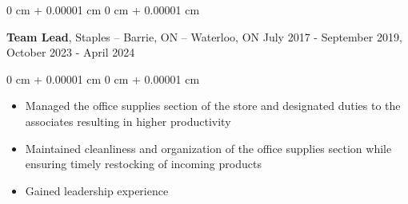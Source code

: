 \documentclass[10pt, letterpaper]{article}
\newenvironment{highlights}{
    \begin{itemize}[
        topsep=0.10 cm,
        parsep=0.10 cm,
        partopsep=0pt,
        itemsep=0pt,
        leftmargin=0 cm + 10pt
    ]
}{
    \end{itemize}
} %
\newenvironment{onecolentry}{
    \begin{adjustwidth}{
        0 cm + 0.00001 cm
    }{
        0 cm + 0.00001 cm
    }
}{
    \end{adjustwidth}
} %
\newenvironment{twocolentry}[2][]{
    \onecolentry
    \def\secondColumn{#2}
    \setcolumnwidth{\fill, 4.5 cm}
    \begin{paracol}{2}
}{
    \switchcolumn \raggedleft \secondColumn
    \end{paracol}
    \endonecolentry
} %
\begin{document}
        \vspace{0.2 cm}

        \begin{twocolentry}{
            July 2017 - September 2019, October 2023 - April 2024
        }
            \textbf{Team Lead}, Staples -- Barrie, ON -- Waterloo, ON\end{twocolentry}

        \vspace{0.10 cm}
        \begin{onecolentry}
            \begin{highlights}
                \item Managed the office supplies section of the store and designated duties to the associates resulting in higher productivity
                \item Maintained cleanliness and organization of the office supplies section while ensuring timely restocking of incoming products

                \item Gained leadership experience
                
            \end{highlights}
        \end{onecolentry}

    
   


    
\end{document}
